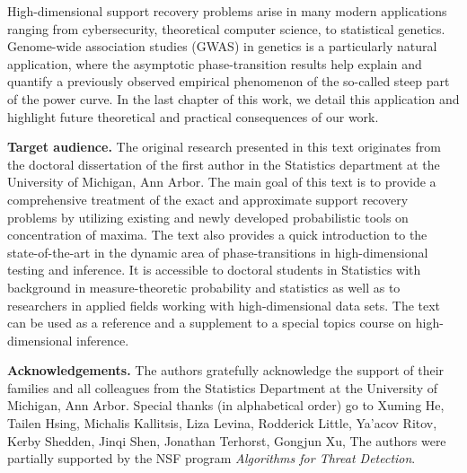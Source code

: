 High-dimensional support recovery problems arise in many modern applications ranging from cybersecurity, theoretical computer science,
to statistical genetics.  Genome-wide association studies (GWAS) in genetics is a particularly natural application, where the asymptotic 
phase-transition results help explain and quantify a previously observed empirical phenomenon of the so-called steep part of the power 
curve.  In the last chapter of this work, we detail this application and highlight future theoretical and practical consequences of our work.


{\bf Target audience.} The original research presented in this text originates from the doctoral dissertation of the first author in the 
Statistics department at the University of Michigan, Ann Arbor.  The main goal of this text is to provide a comprehensive treatment of the
exact and approximate support recovery problems by utilizing existing and newly developed probabilistic tools on concentration of maxima.
The text also provides a quick introduction to the state-of-the-art in the dynamic area of phase-transitions in high-dimensional 
testing and inference.  It is accessible to doctoral students in Statistics with background in measure-theoretic probability and  
statistics as well as to researchers in applied fields working with high-dimensional data sets.  The text can be used as a reference and a
supplement to a special topics course on high-dimensional inference.

{\bf Acknowledgements.} The authors gratefully acknowledge the support of their families and all colleagues from the Statistics Department 
at the University of Michigan, Ann Arbor.   Special thanks (in alphabetical order) go to Xuming He, Tailen Hsing, Michalis Kallitsis, Liza Levina, 
Rodderick Little, Ya'acov Ritov, Kerby Shedden, Jinqi Shen, Jonathan Terhorst, Gongjun Xu, 
The authors were partially supported by the NSF program {\em Algorithms for Threat Detection}.


